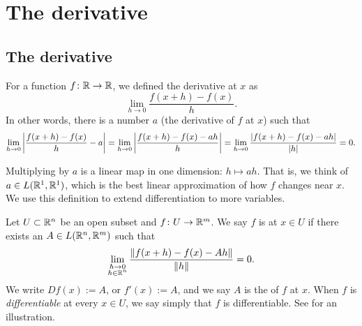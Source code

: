 
\sectionnewpage
\section{The derivative}
\label{sec:svtheder}


\subsection{The derivative}

For a function $f \colon {\mathbb{R}} \to {\mathbb{R}}$, we defined
the derivative at $x$ as
\begin{equation*}
\lim_{h \to 0} \frac{f(x+h)-f(x)}{h} .
\end{equation*}
In other words, there is a number $a$ (the derivative of $f$ at $x$) such that
\begin{equation*}
\lim_{h \to 0} \left\lvert {\frac{f(x+h)-f(x)}{h} - a} \right\rvert =
\lim_{h \to 0} \left\lvert {\frac{f(x+h)-f(x) - ah}{h}} \right\rvert
=
\lim_{h \to 0} \frac{\lvert {f(x+h)-f(x) - ah} \rvert}{\lvert {h} \rvert}
= 0.
\end{equation*}

Multiplying by $a$ is a linear map in one dimension:
$h \mapsto ah$.
That is,
we think of $a \in L({\mathbb{R}}^1,{\mathbb{R}}^1)$, 
which is the best linear approximation of
how $f$ changes near $x$.  We use this definition
to extend differentiation to more variables.

\begin{defn}
Let $U \subset {\mathbb{R}}^n$ be an open subset and $f \colon U \to {\mathbb{R}}^m$.  We
say $f$ is \emph{} at $x \in U$ if there exists
an $A \in L({\mathbb{R}}^n,{\mathbb{R}}^m)$ such that
\begin{equation*}
\lim_{\substack{h \to 0\\h\in {\mathbb{R}}^n}}
\frac{\lVert {f(x+h)-f(x) - Ah} \rVert}{\lVert {h} \rVert} = 0 .
\end{equation*}
We write $Df(x) := A$, or $f'(x) := A$, and
we say $A$ is the \emph{} of $f$ at $x$.
When $f$ is \emph{differentiable} at
every $x \in U$, we say simply that $f$ is differentiable.  See
 for an illustration.
\end{defn}

